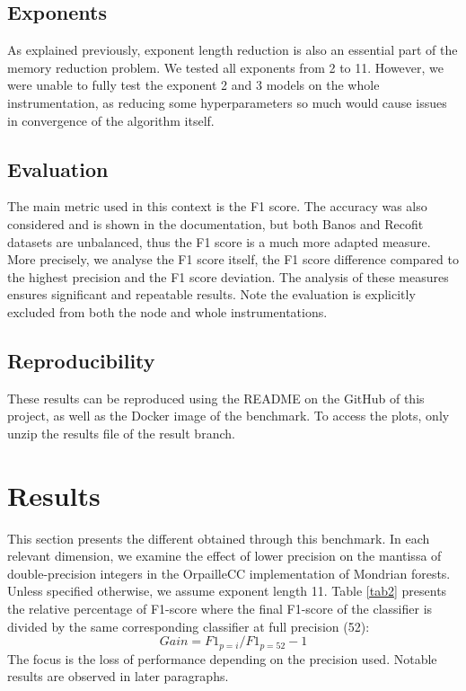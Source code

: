 \documentclass[conference]{IEEEtran}
\begin{document}
\subsection{Exponents}
As explained previously, exponent length reduction is also an essential part of the memory reduction problem. We tested all exponents from 2 to 11. However, we were unable to fully test the exponent 2 and 3 models on the whole instrumentation, as reducing some hyperparameters so much would cause issues in convergence of the algorithm itself.
\subsection{Evaluation}
The main metric used in this context is the F1 score. The accuracy was also considered and is shown in the documentation, but both Banos and Recofit datasets are unbalanced, thus the F1 score is a much more adapted measure. More precisely, we analyse the F1 score itself, the F1 score difference compared to the highest precision and the F1 score deviation. The analysis of these measures ensures significant and repeatable results. Note the evaluation is explicitly excluded from both the node and whole instrumentations.
\subsection{Reproducibility}
These results can be reproduced using the README on the GitHub of this project, as well as the Docker image of the benchmark. To access the plots, only unzip the results file of the result branch.

\section{Results}
This section presents the different obtained through this benchmark. In each relevant dimension, we examine the effect of lower precision on the mantissa of double-precision integers in the OrpailleCC implementation of Mondrian forests. Unless specified otherwise, we assume exponent length 11. Table \ref{tab2} presents the relative percentage of F1-score where the final F1-score of the classifier is divided by the same corresponding classifier at full precision (52):
\begin{equation}
Gain = F1_{p=i} / F1_{p=52}-1 \label{eq3}
\end{equation}
The focus is the loss of performance depending on the precision used. Notable results are observed in later paragraphs.
\end{document}

